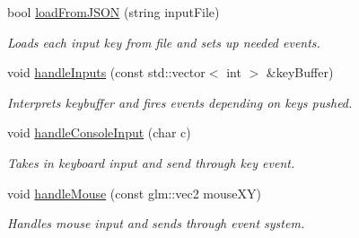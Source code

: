 \begin{DoxyCompactItemize}
\mbox{\label{class_input_handler_aeb71183f7023decf10d19b949480a574}} 
bool \mbox{\hyperlink{class_input_handler_aeb71183f7023decf10d19b949480a574}{load\+From\+J\+S\+ON}} (string input\+File)
\begin{DoxyCompactList}\small\item\em Loads each input key from file and sets up needed events. \end{DoxyCompactList}\item 
\mbox{\label{class_input_handler_ab3b5fe17099a9bffe0a1dcedf4a439ed}} 
void \mbox{\hyperlink{class_input_handler_ab3b5fe17099a9bffe0a1dcedf4a439ed}{handle\+Inputs}} (const std\+::vector$<$ int $>$ \&key\+Buffer)
\begin{DoxyCompactList}\small\item\em Interprets keybuffer and fires events depending on keys pushed. \end{DoxyCompactList}\item 
\mbox{\label{class_input_handler_a2ae198e972137bde4f2fe5b7c899a2e4}} 
void \mbox{\hyperlink{class_input_handler_a2ae198e972137bde4f2fe5b7c899a2e4}{handle\+Console\+Input}} (char c)
\begin{DoxyCompactList}\small\item\em Takes in keyboard input and send through key event. \end{DoxyCompactList}\item 
\mbox{\label{class_input_handler_a0ebc7e1f1c6f9f53e8b7a97df8fb7233}} 
void \mbox{\hyperlink{class_input_handler_a0ebc7e1f1c6f9f53e8b7a97df8fb7233}{handle\+Mouse}} (const glm\+::vec2 mouse\+XY)
\begin{DoxyCompactList}\small\item\em Handles mouse input and sends through event system. \end{DoxyCompactList}\end{DoxyCompactItemize}
